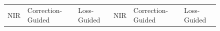 \begin{figure}[htp!]
    \centering
    \begin{tabularx}{\textwidth}{Y Y Y !{\space} Y Y Y}
        \centering NIR                                                                                            & Correction-Guided                                                                                                                 & Loss-Guided                                                                                                                 & NIR                                                                                                       & Correction-Guided                                                                                                                 & Loss-Guided                                                                                                                 \\

\end{tabularx}
\end{figure}

